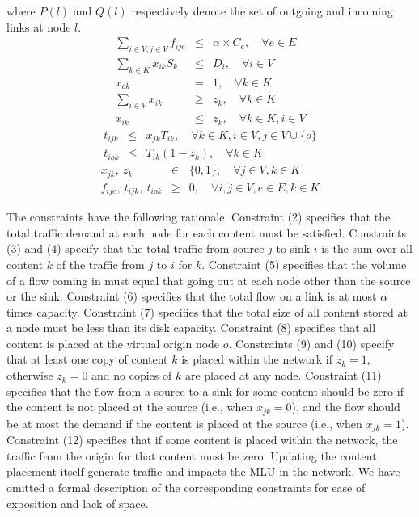 where $P(l)$ and $Q(l)$ respectively denote the set of outgoing and incoming links at node $l$.
\begin{eqnarray}
 \sum_{i \in V, j \in V} f_{ije} &\leq& \alpha \times C_e, \quad \forall e \in E \\
 \sum_{k \in K}  x_{ik}S_k &\leq& D_i , \quad \forall i \in V\\
x_{ok} &=& 1, \quad \forall  k \in K \\
\sum_{i \in V}  x_{ik} &\geq& z_k, \quad \forall k \in K  \\
x_{ik} &\leq& z_k, \quad \forall k \in K, i \in V  
\end{eqnarray}
\vspace{-0.25in}
\begin{eqnarray}
t_{ijk} &\leq&  x_{jk} T_{ik},  \quad \forall k \in K,  i \in V, j \in V \cup \{o\}\\
t_{iok} &\leq& T_{ik}(1 - z_k), \quad  \forall   k \in K 
\end{eqnarray}
\vspace{-0.25in}
\begin{eqnarray*}
x_{jk}, \ z_k &\in& \{0,1\}, \quad \forall j \in V, k \in K\\
f_{ije}, \ t_{ijk}, \ t_{iok} &\geq& 0, \quad \forall  i,j \in V, e \in E, k\in K
\end{eqnarray*}


The constraints have the following rationale.
Constraint (2) specifies that the total traffic demand at each node for each content must be satisfied.
Constraints (3) and (4) specify that the total traffic from source $j$ to sink $i$ is the sum over all content $k$ of the traffic from $j$ to $i$ for $k$.
Constraint (5) specifies that the volume of a flow coming in must equal that going out at each node other than the source or the sink.
Constraint (6) specifies that the total flow on a link is at most $\alpha$ times capacity.
Constraint (7) specifies that the total size of all content stored at a node must be less than its disk capacity.
Constraint (8) specifies that all content is placed at the virtual origin node $o$.
Constraints (9) and (10) specify that at least one copy of content $k$ is placed within the network if $z_k = 1$, otherwise $z_k = 0$ and no copies of $k$ are placed at any node. Constraint (11) specifies that the flow from a source to a sink for some content should be zero if the content is not placed at the source (i.e., when $x_{jk} = 0$), and the flow should be at most the demand if the content is placed at the source  (i.e., when $x_{jk} = 1$).
Constraint (12) specifies that if some content is placed within the network, the traffic from the origin for that content must be zero. Updating the content placement itself generate traffic and impacts the MLU in the network. We have omitted a formal description of the corresponding constraints for ease of exposition and lack of space. %

